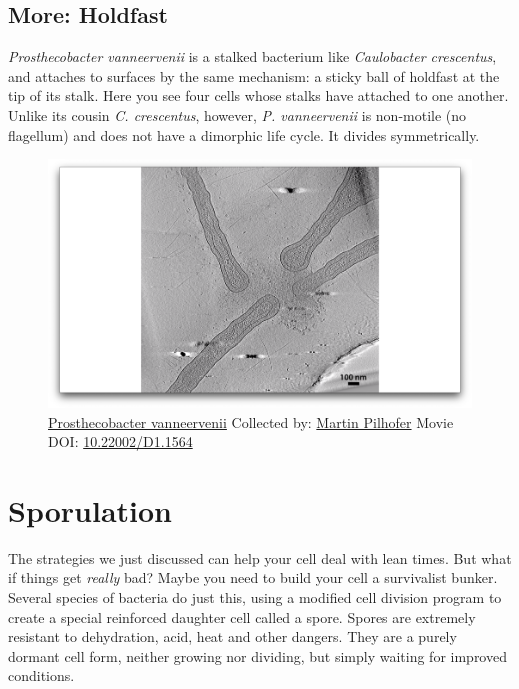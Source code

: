 \documentclass[]{tufte-book}
\begin{document}
\hypertarget{Holdfast}{\subsection*{More: Holdfast}\label{Holdfast}}

\emph{Prosthecobacter vanneervenii} is a stalked bacterium like
\emph{Caulobacter crescentus}, and attaches to surfaces by the same
mechanism: a sticky ball of holdfast at the tip of its stalk. Here you
see four cells whose stalks have attached to one another. Unlike its
cousin \emph{C. crescentus}, however, \emph{P. vanneervenii} is
non-motile (no flagellum) and does not have a dimorphic life cycle. It
divides symmetrically.





\begin{figure}
\includegraphics{movie_stills/8_4a} \caption[\protect\hyperlink{tree}{Prosthecobacter vanneervenii}
Collected by: \protect\hyperlink{martin_pilhofer}{Martin Pilhofer} Movie
DOI: \href{https://doi.org/10.22002/D1.1564}{10.22002/D1.1564}]{\protect\hyperlink{tree}{Prosthecobacter vanneervenii}
Collected by: \protect\hyperlink{martin_pilhofer}{Martin Pilhofer} Movie
DOI: \href{https://doi.org/10.22002/D1.1564}{10.22002/D1.1564}}\label{fig:8-4a}
\end{figure}

\section{Sporulation}\label{sporulation}

The strategies we just discussed can help your cell deal with lean
times. But what if things get \emph{really} bad? Maybe you need to build
your cell a survivalist bunker. Several species of bacteria do just
this, using a modified cell division program to create a special
reinforced daughter cell called a spore. Spores are extremely resistant
to dehydration, acid, heat and other dangers. They are a purely dormant
cell form, neither growing nor dividing, but simply waiting for improved
conditions.
\end{document}
